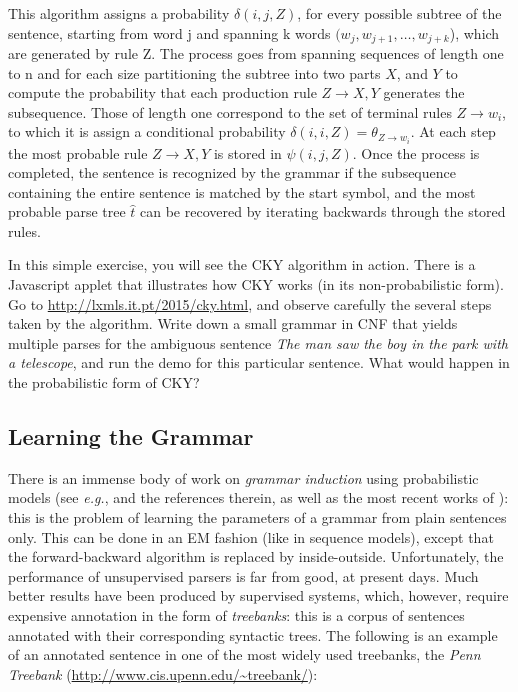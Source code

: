 This algorithm assigns a probability $\delta(i,j,Z)$, for every possible subtree of the sentence, starting from word j and spanning k words $(w_j,w_{j+1},\dots,w_{j+k}$), which are generated by rule Z. The process goes from spanning sequences of length one to n and for each size partitioning the subtree into two parts $X$, and $Y$ to compute the probability that each production rule $Z\rightarrow X,Y$ generates the subsequence. Those of length one correspond to the set of terminal rules ${Z\rightarrow w_i}$, to which it is assign a conditional probability $\delta(i,i,Z)=\theta_{Z\rightarrow w_i}$. At each step the most probable rule $Z\rightarrow X,Y$ is stored in $\psi(i,j,Z)$.
Once the process is completed, the sentence is recognized by the grammar if the subsequence containing the entire sentence is matched by the start symbol, and the most probable parse tree $\hat{t}$ can be recovered by iterating backwards through the stored rules.

\begin{exercise}\label{exer:cky}
In this simple exercise, you will see the CKY algorithm in action. There is a Javascript applet that 
illustrates how CKY works (in its non-probabilistic form). 
Go to \url{http://lxmls.it.pt/2015/cky.html}, and 
observe carefully the several steps taken by the algorithm. 
Write down a small grammar in CNF that yields multiple parses for 
the ambiguous sentence \emph{The man saw the boy in the park with a telescope}, 
and run the demo for this particular sentence. What would happen in the probabilistic form of CKY? 
\end{exercise}

\subsection{Learning the Grammar}

There is an immense body of work on \emph{grammar induction} using probabilistic models (see \emph{e.g.}, \citet{Manning1999} 
and the references therein, as well as the most recent works of \citet{Klein2002,Smith2005,Cohen2008}): this is the problem of 
learning the parameters of a grammar from plain sentences only. This can be done in an EM fashion (like in sequence models), 
except that the forward-backward algorithm is replaced by inside-outside. 
Unfortunately, the performance of unsupervised parsers is far from good, at present days. 
Much better results have been produced by supervised systems, which, however, require expensive annotation in the form of 
\emph{treebanks}: this is a corpus of sentences annotated with their corresponding syntactic trees. 
The following is an example of an annotated sentence in one of the most widely used treebanks, the \emph{Penn Treebank} 
(\url{http://www.cis.upenn.edu/~treebank/}): 

